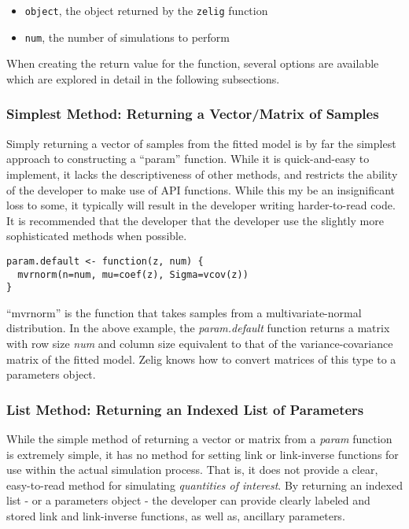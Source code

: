 \begin{itemize}
	\item{{\tt object}, the object returned by the {\tt zelig} function}
	\item{{\tt num}, the number of simulations to perform}
\end{itemize}

When creating the return value for the function, several options are available which are explored in detail in the following subsections.

\subsubsection{Simplest Method: Returning a Vector/Matrix of Samples}

Simply returning a vector of samples from the fitted model is by far the simplest approach to constructing a ``param'' function.  While it is quick-and-easy to implement, it lacks the descriptiveness of other methods, and restricts the ability of the developer to make use of API functions.  While this my be an insignificant loss to some, it typically will result in the developer writing harder-to-read code.  It is recommended that the developer that the developer use the slightly more sophisticated methods when possible.

\begin{verbatim}
param.default <- function(z, num) {
  mvrnorm(n=num, mu=coef(z), Sigma=vcov(z))
}
\end{verbatim}

``mvrnorm'' is the function that takes samples from a multivariate-normal distribution.  In the above example, the \emph{param.default} function returns a matrix with row size \emph{num} and column size equivalent to that of the variance-covariance matrix of the fitted model.  Zelig knows how to convert matrices of this type to a parameters object.

\subsubsection{List Method: Returning an Indexed List of Parameters}

While the simple method of returning a vector or matrix from a \emph{param} function is extremely simple, it has no method for setting link or link-inverse functions for use within the actual simulation process.  That is, it does not provide a clear, easy-to-read method for simulating \emph{quantities of interest}.  By returning an indexed list - or a parameters object - the developer can provide clearly labeled and stored link and link-inverse functions, as well as, ancillary parameters.


